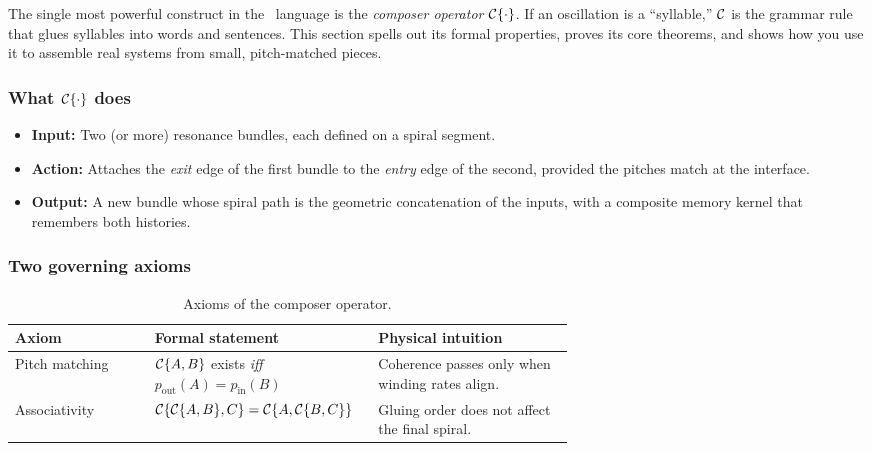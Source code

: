 The single most powerful construct in the \RCM\ language is the \emph{composer operator} \(\mathcal{C}\{\cdot\}\). If an oscillation is a “syllable,” \(\mathcal{C}\) is the grammar rule that glues syllables into words and sentences. This section spells out its formal properties, proves its core theorems, and shows how you use it to assemble real systems from small, pitch-matched pieces.

\subsubsection{What \(\mathcal{C}\{\cdot\}\) does}

\begin{itemize}[leftmargin=1.5em]
  \item \textbf{Input:} Two (or more) resonance bundles, each defined on a spiral segment.
  \item \textbf{Action:} Attaches the \emph{exit} edge of the first bundle to the \emph{entry} edge of the second, provided the pitches match at the interface.
  \item \textbf{Output:} A new bundle whose spiral path is the geometric concatenation of the inputs, with a composite memory kernel that remembers both histories.
\end{itemize}

\subsubsection{Two governing axioms}

\begin{table}[H]
  \small
  \centering
  \caption{Axioms of the composer operator.}
  \label{tab:composer-axioms}
  \renewcommand{\arraystretch}{1.15}
  \begin{tabularx}{\linewidth}{@{}p{0.25\linewidth} p{0.40\linewidth} X@{}}
    \toprule
    \textbf{Axiom}         & \textbf{Formal statement}                                                        & \textbf{Physical intuition} \\
    \midrule
    Pitch matching         & \(\mathcal{C}\{A,B\}\) exists \emph{iff} \(p_{\mathrm{out}}(A)=p_{\mathrm{in}}(B)\) & Coherence passes only when winding rates align. \\
    Associativity          & \(\mathcal{C}\{\mathcal{C}\{A,B\},C\}=\mathcal{C}\{A,\mathcal{C}\{B,C\}\}\)             & Gluing order does not affect the final spiral. \\
    \bottomrule
  \end{tabularx}
\end{table}

